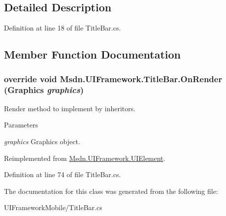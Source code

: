 \subsection{Detailed Description}


Definition at line 18 of file TitleBar.cs.

\subsection{Member Function Documentation}
\hypertarget{class_msdn_1_1_u_i_framework_1_1_title_bar_a55b0b153ab7d2b085e6731e3f6aaa55e}{
\subsubsection[{OnRender}]{\setlength{\rightskip}{0pt plus 5cm}override void Msdn.UIFramework.TitleBar.OnRender (Graphics {\em graphics})}}
\label{class_msdn_1_1_u_i_framework_1_1_title_bar_a55b0b153ab7d2b085e6731e3f6aaa55e}


Render method to implement by inheritors. 
\begin{DoxyParams}{Parameters}
\item[{\em graphics}]Graphics object.\end{DoxyParams}


Reimplemented from \hyperlink{class_msdn_1_1_u_i_framework_1_1_u_i_element_a20b2245806231553935896fe7731812b}{Msdn.UIFramework.UIElement}.

Definition at line 74 of file TitleBar.cs.

The documentation for this class was generated from the following file:\begin{DoxyCompactItemize}
\item 
UIFrameworkMobile/TitleBar.cs\end{DoxyCompactItemize}
